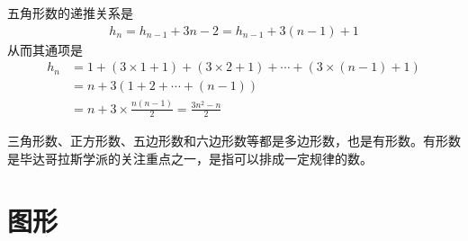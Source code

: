 五角形数的递推关系是
\begin{align*}
  h_n = h_{n-1} + 3n - 2 = h_{n-1} + 3(n-1) + 1
\end{align*}
从而其通项是
\begin{align*}
  h_n & = 1 + (3\times 1 + 1) + (3\times 2 + 1) + \cdots + (3\times (n-1) + 1) \\
      & = n + 3\left(1 + 2 + \cdots + (n-1)\right)\\
      & = n + 3\times\frac{n(n-1)}{2} = \frac{3n^2-n}{2}
\end{align*}

三角形数、正方形数、五边形数和六边形数等都是{\kai 多边形数}，也是{\kai 有形数}。有形数是毕达哥拉斯学派的关注重点之一，是指可以排成一定规律的数。


  
\section{图形}
\label{sec:graph-pattern}

